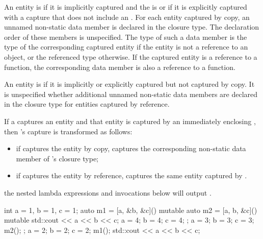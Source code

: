 \pnum
An entity is  if it is implicitly captured and the
 is \tcode{=} or if it is explicitly captured with a
capture that does not include an \tcode{\&}. For each entity captured by copy, an
unnamed non-static data member is declared in the closure type. The declaration order of
these members is unspecified. The type of such a data member is the type of the
corresponding captured entity if the entity is not a reference to an object, or the
referenced type otherwise. \enternote If the captured entity is a reference to a
function, the corresponding data member is also a reference to a function. \exitnote

\pnum
An entity is  if it is implicitly or explicitly
captured but not captured by copy. It is unspecified whether additional unnamed
non-static data members are declared in the closure type for entities captured by
reference.

\pnum
If a   captures an entity and that entity is
captured by an immediately enclosing 
, then
's capture is transformed as follows:

\begin{itemize}
\item if  captures the entity by copy,
 captures the corresponding
non-static data member of 's closure type;

\item if  captures the entity by reference,
 captures the same
entity captured by .
\end{itemize}
\enterexample the nested lambda expressions and invocations below will output
.
\begin{codeblock}
int a = 1, b = 1, c = 1;
auto m1 = [a, &b, &c]() mutable {
  auto m2 = [a, b, &c]() mutable {
    std::cout << a << b << c;
    a = 4; b = 4; c = 4;
  };
  a = 3; b = 3; c = 3;
  m2();
};
a = 2; b = 2; c = 2;
m1();
std::cout << a << b << c;
\end{codeblock}
\exitexample


